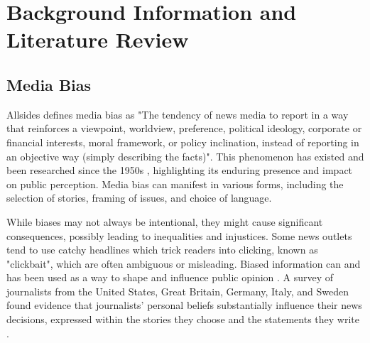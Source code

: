 \chapter{Background Information and Literature Review}
\label{cha:2}


\section{Media Bias}

Allsides \cite{allsides-2022-bias-definition} defines media bias as "The tendency of news media to report in a way that reinforces a viewpoint, worldview, preference, political ideology, corporate or financial interests, moral framework, or policy inclination, instead of reporting in an objective way (simply describing the facts)". This phenomenon has existed and been researched since the 1950s \cite{white-1950-case-study-selection-news}, highlighting its enduring presence and impact on public perception. Media bias can manifest in various forms, including the selection of stories, framing of issues, and choice of language.

While biases may not always be intentional, they might cause significant consequences, possibly leading to inequalities and injustices. Some news outlets tend to use catchy headlines which trick readers into clicking, known as "clickbait", which are often ambiguous or misleading. Biased information can and has been used as a way to shape and influence public opinion \cite{aires-2020-information}. A survey of journalists from the United States, Great Britain, Germany, Italy, and Sweden found evidence that journalists' personal beliefs substantially influence their news decisions, expressed within the stories they choose and the statements they write \cite{patterson-donsbach-1996-news-decisions}.

